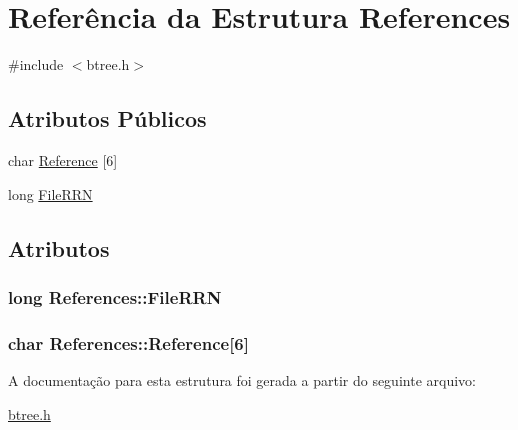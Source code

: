 \hypertarget{structReferences}{\section{Referência da Estrutura References}
\label{structReferences}
}


{\ttfamily \#include $<$btree.\-h$>$}

\subsection*{Atributos Públicos}
\begin{DoxyCompactItemize}
\item 
char \hyperlink{structReferences_a76ed9d53f62799ea5f916124cca1a685}{Reference} \mbox{[}6\mbox{]}
\item 
long \hyperlink{structReferences_a884952e56c9d604053e609ba3176b61b}{File\-R\-R\-N}
\end{DoxyCompactItemize}


\subsection{Atributos}
\hypertarget{structReferences_a884952e56c9d604053e609ba3176b61b}{
\subsubsection[{File\-R\-R\-N}]{\setlength{\rightskip}{0pt plus 5cm}long References\-::\-File\-R\-R\-N}}\label{structReferences_a884952e56c9d604053e609ba3176b61b}
\hypertarget{structReferences_a76ed9d53f62799ea5f916124cca1a685}{
\subsubsection[{Reference}]{\setlength{\rightskip}{0pt plus 5cm}char References\-::\-Reference\mbox{[}6\mbox{]}}}\label{structReferences_a76ed9d53f62799ea5f916124cca1a685}


A documentação para esta estrutura foi gerada a partir do seguinte arquivo\-:\begin{DoxyCompactItemize}
\item 
\hyperlink{btree_8h}{btree.\-h}\end{DoxyCompactItemize}
